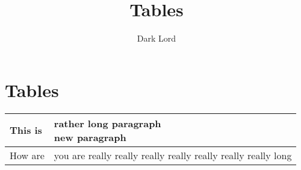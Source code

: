 \documentclass{article}
\title{Tables}
\author{Dark Lord}
\begin{document}
\maketitle

\section{Tables}

\begin{tabular}{|l|m{4cm}|}
    \hline
    This is & \parbox{4cm}{rather long paragraph\\new paragraph} \\ \hline
    How are & you are really really really really really really really long\\ \hline
\end{tabular}
\end{document}
